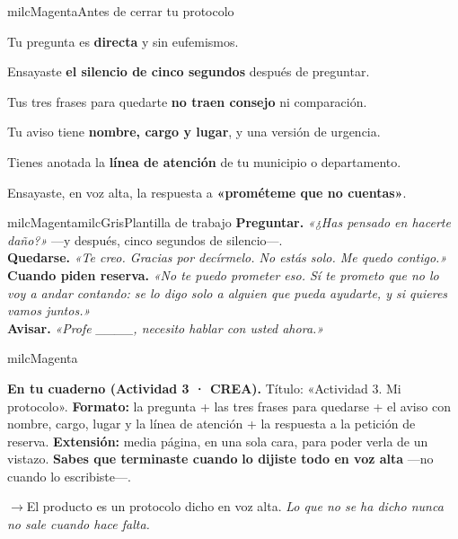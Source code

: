 \documentclass[11pt,letterpaper]{article}
\newcommand{\puente}[1]{%
  \begin{puentebox}%
    \textcolor{milcGradeDark}{$\rightarrow$}\hspace{2mm}#1%
  \end{puentebox}%
}
\begin{document}
\begin{drawbox}{milcMagenta}{Antes de cerrar tu protocolo}
\begin{checklista}
\item Tu pregunta es \textbf{directa} y sin eufemismos.
\item Ensayaste \textbf{el silencio de cinco segundos} después de preguntar.
\item Tus tres frases para quedarte \textbf{no traen consejo} ni comparación.
\item Tu aviso tiene \textbf{nombre, cargo y lugar}, y una versión de urgencia.
\item Tienes anotada la \textbf{línea de atención} de tu municipio o departamento.
\item Ensayaste, en voz alta, la respuesta a \textbf{«prométeme que no cuentas»}.
\end{checklista}
\end{drawbox}

\begin{softbox}{milcMagenta}{milcGris}{Plantilla de trabajo}
\textbf{Preguntar.} \emph{«¿Has pensado en hacerte daño?»} ---y después, cinco segundos de silencio---. \\[1mm]
\textbf{Quedarse.} \emph{«Te creo. Gracias por decírmelo. No estás solo. Me quedo contigo.»} \\[1mm]
\textbf{Cuando piden reserva.} \emph{«No te puedo prometer eso. Sí te prometo que no lo voy a andar contando: se lo digo solo a alguien que pueda ayudarte, y si quieres vamos juntos.»} \\[1mm]
\textbf{Avisar.} \emph{«Profe \_\_\_\_, necesito hablar con usted ahora.»}
\end{softbox}

\begin{infoband}{milcMagenta}


\textbf{En tu cuaderno (Actividad 3 · CREA).} Título: «Actividad 3. Mi protocolo». \textbf{Formato:} la pregunta + las tres frases para quedarse + el aviso con nombre, cargo, lugar y la línea de atención + la respuesta a la petición de reserva. \textbf{Extensión:} media página, en una sola cara, para poder verla de un vistazo. \textbf{Sabes que terminaste cuando} \textbf{lo dijiste todo en voz alta} ---no cuando lo escribiste---.
\end{infoband}

\puente{El producto es un protocolo dicho en voz alta. \emph{Lo que no se ha dicho nunca no sale cuando hace falta.}}
\end{document}
